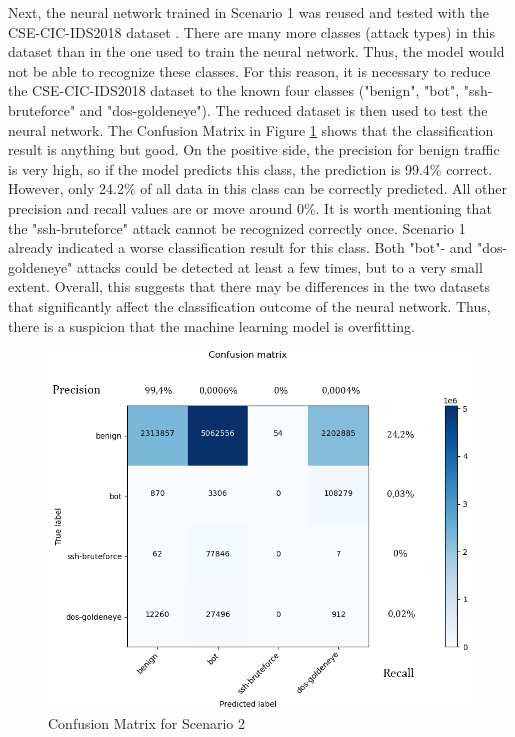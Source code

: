 \documentclass[conference]{IEEEtran}
\begin{document}
Next, the neural network trained in Scenario 1 was reused and tested with the CSE-CIC-IDS2018 dataset \cite{max2}. There are many more classes (attack types) in this dataset than in the one used to train the neural network. Thus, the model would not be able to recognize these classes. For this reason, it is necessary to reduce the CSE-CIC-IDS2018 dataset \cite{max2} to the known four classes ("benign", "bot", "ssh-bruteforce" and "dos-goldeneye"). The reduced dataset is then used to test the neural network. The Confusion Matrix in Figure  \ref{fig:cm2} shows that the classification result is anything but good. On the positive side, the precision for benign traffic is very high, so if the model predicts this class, the prediction is 99.4\% correct. However, only 24.2\% of all data in this class can be correctly predicted. All other precision and recall values are or move around 0\%. It is worth mentioning that the "ssh-bruteforce" attack cannot be recognized correctly once. Scenario 1 already indicated a worse classification result for this class. Both "bot"- and "dos-goldeneye" attacks could be detected at least a few times, but to a very small extent. Overall, this suggests that there may be differences in the two datasets that significantly affect the classification outcome of the neural network. Thus, there is a suspicion that the machine learning model is overfitting.

\begin{figure}[htbp]  
\centerline{\includegraphics[scale=0.65]{NeuesModellAlteDaten.png}}
\caption{Confusion Matrix for Scenario 2}
\label{fig:cm2}
\end{figure}
\end{document}
